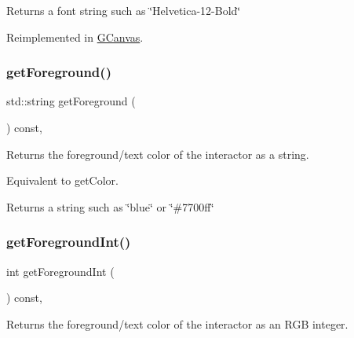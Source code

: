 \begin{DoxyReturn}{Returns}
a font string such as \char`\"{}\+Helvetica-\/12-\/\+Bold\char`\"{} 
\end{DoxyReturn}


Reimplemented in \mbox{\hyperlink{classGCanvas_a24420d98f18927d2c201a3ab55ffdcec}{G\+Canvas}}.

\mbox{\label{classGInteractor_a4fa2d8b0192a3a5b4af4bbfe71194d03}} 
\subsubsection{\texorpdfstring{get\+Foreground()}{getForeground()}}
{\footnotesize\ttfamily std\+::string get\+Foreground (\begin{DoxyParamCaption}{ }\end{DoxyParamCaption}) const\hspace{0.3cm}{\ttfamily [virtual]}, {\ttfamily [inherited]}}



Returns the foreground/text color of the interactor as a string. 

Equivalent to get\+Color. \begin{DoxyReturn}{Returns}
a string such as \char`\"{}blue\char`\"{} or \char`\"{}\#7700ff\char`\"{} 
\end{DoxyReturn}
\mbox{\label{classGInteractor_ac3b12ab385a6ef9ae90fc879860ba726}} 
\subsubsection{\texorpdfstring{get\+Foreground\+Int()}{getForegroundInt()}}
{\footnotesize\ttfamily int get\+Foreground\+Int (\begin{DoxyParamCaption}{ }\end{DoxyParamCaption}) const\hspace{0.3cm}{\ttfamily [virtual]}, {\ttfamily [inherited]}}



Returns the foreground/text color of the interactor as an R\+GB integer. 


